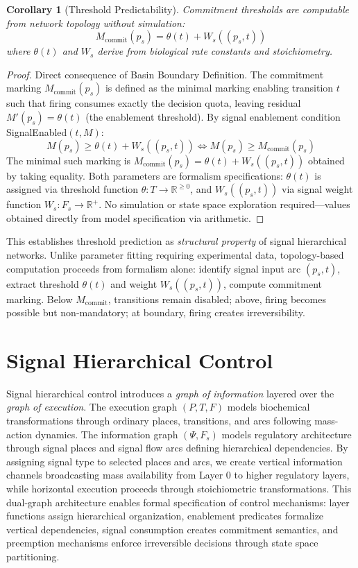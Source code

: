 \documentclass[10pt,letterpaper]{article}
\newtheorem{corollary}[theorem]{Corollary}
\begin{document}
\begin{corollary}[Threshold Predictability]
Commitment thresholds are computable from network topology without simulation:
\[
M_{\text{commit}}(p_s) = \theta(t) + W_s((p_s,t))
\]
where $\theta(t)$ and $W_s$ derive from biological rate constants and stoichiometry.
\end{corollary}

\begin{proof}
Direct consequence of Basin Boundary Definition. The commitment marking $M_{\text{commit}}(p_s)$ is defined as the minimal marking enabling transition $t$ such that firing consumes exactly the decision quota, leaving residual $M'(p_s) = \theta(t)$ (the enablement threshold). By signal enablement condition SignalEnabled$(t,M)$:
\begin{equation*}
M(p_s) \geq \theta(t) + W_s((p_s,t)) \iff M(p_s) \geq M_{\text{commit}}(p_s)
\end{equation*}
The minimal such marking is
$M_{\text{commit}}(p_s) = \theta(t) + W_s((p_s,t))$
obtained by taking equality. Both parameters are formalism specifications: $\theta(t)$ is assigned via threshold function $\theta: T \rightarrow \mathbb{R}^{\geq 0}$, and $W_s((p_s,t))$ via signal weight function $W_s: F_s \rightarrow \mathbb{R}^+$. No simulation or state space exploration required---values obtained directly from model specification via arithmetic.
\end{proof}

This establishes threshold prediction as \textit{structural property} of signal hierarchical networks. Unlike parameter fitting requiring experimental data, topology-based computation proceeds from formalism alone: identify signal input arc $(p_s,t)$, extract threshold $\theta(t)$ and weight $W_s((p_s,t))$, compute commitment marking. Below $M_{\text{commit}}$, transitions remain disabled; above, firing becomes possible but non-mandatory; at boundary, firing creates irreversibility.

\section{Signal Hierarchical Control}

Signal hierarchical control introduces a \textit{graph of information} layered over the \textit{graph of execution}. The execution graph $(P, T, F)$ models biochemical transformations through ordinary places, transitions, and arcs following mass-action dynamics. The information graph $(\Psi, F_s)$ models regulatory architecture through signal places and signal flow arcs defining hierarchical dependencies. By assigning signal type to selected places and arcs, we create vertical information channels broadcasting mass availability from Layer 0 to higher regulatory layers, while horizontal execution proceeds through stoichiometric transformations. This dual-graph architecture enables formal specification of control mechanisms: layer functions assign hierarchical organization, enablement predicates formalize vertical dependencies, signal consumption creates commitment semantics, and preemption mechanisms enforce irreversible decisions through state space partitioning.
\end{document}
